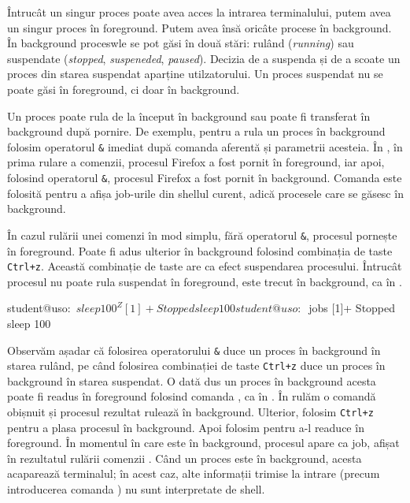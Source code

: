 Întrucât un singur proces poate avea acces la intrarea terminalului, putem avea
un singur proces în foreground. Putem avea însă oricâte procese în background.
În background proceswle se pot găsi în două stări: rulând (\textit{running}) sau
suspendate (\textit{stopped}, \textit{suspeneded}, \textit{paused}). Decizia de a suspenda și de a scoate
un proces din starea suspendat aparține utilzatorului. Un proces suspendat nu se
poate găsi în foreground, ci doar în background.

Un proces poate rula de la început în background sau poate fi transferat în
background după pornire. De exemplu, pentru a rula un proces în background
folosim operatorul \texttt{\&} imediat după comanda aferentă și parametrii acesteia. În ,
în prima rulare a comenzii, procesul Firefox a fost pornit în foreground,
iar apoi, folosind operatorul \texttt{\&}, procesul Firefox a fost pornit în background.
Comanda  este folosită pentru a afișa job-urile din shellul curent, adică
procesele care se găsesc în background.


În cazul rulării unei comenzi în mod simplu, fără operatorul \texttt{\&}, procesul
pornește în foreground. Poate fi adus ulterior în background folosind combinația
de taste \texttt{Ctrl+z}. Această combinație de taste are ca efect suspendarea
procesului. Întrucât procesul nu poate rula suspendat în foreground, este trecut
în background, ca în .

\begin{screen}[caption={Suspendarea unui process în background},escapechar=,label={lst:process:background-suspend}]
student@uso:~$ sleep 100
^Z
[1]+  Stopped                 sleep 100
student@uso:~$ jobs
[1]+  Stopped                 sleep 100
\end{screen}

Observăm așadar că folosirea operatorului \texttt{\&} duce un proces în background în
starea rulând, pe când folosirea combinației de taste \texttt{Ctrl+z} duce un proces în
background în starea suspendat. O dată dus un proces în background acesta poate
fi readus în foreground folosind comanda , ca în .
În  rulăm o comandă obișnuit și procesul rezultat rulează în
background. Ulterior, folosim \texttt{Ctrl+z} pentru a plasa procesul în background. Apoi
folosim  pentru a-l readuce în foreground. În momentul în care este în background, procesul apare ca job, afișat în rezultatul rulării comenzii . Când un proces este în background, acesta acaparează terminalul; în acest caz, alte informații trimise la intrare (precum introducerea comanda ) nu sunt interpretate de shell.


